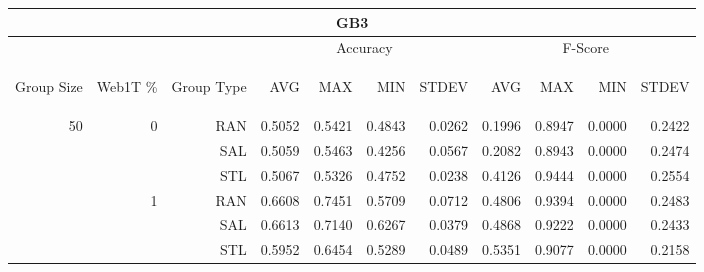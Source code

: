 \begin{center}
\begin{table}[htbp] 
 \begin{center}
\begin{tabular}{ | r | r | r | r | r | r | r | r | r | r | r |}
\hline
\multicolumn{11}{|c|}{GB3}\\
\hline
 & & & \multicolumn{4}{|c|}{Accuracy} & \multicolumn{4}{|c|}{F-Score}\\ \cline{4-11}
\begin{sideways}Group Size\end{sideways} & \begin{sideways}Web1T \%\end{sideways} & \begin{sideways}Group Type\end{sideways} & \begin{sideways}AVG\end{sideways} & \begin{sideways}MAX\end{sideways} & \begin{sideways}MIN\end{sideways} & \begin{sideways}STDEV\end{sideways} & \begin{sideways}AVG\end{sideways} & \begin{sideways}MAX\end{sideways} & \begin{sideways}MIN\end{sideways} & \begin{sideways}STDEV\end{sideways}\\
\hline
\multirow{18}{*}{50}
 & \multirow{3}{*}{0} & RAN & 0.5052 & 0.5421 & 0.4843 & 0.0262 & 0.1996 & 0.8947 & 0.0000 & 0.2422\\ \cline{3-11}
 &   & SAL & 0.5059 & 0.5463 & 0.4256 & 0.0567 & 0.2082 & 0.8943 & 0.0000 & 0.2474\\ \cline{3-11}
 &   & STL & 0.5067 & 0.5326 & 0.4752 & 0.0238 & 0.4126 & 0.9444 & 0.0000 & 0.2554\\ \cline{2-11}
 & \multirow{3}{*}{1} & RAN & 0.6608 & 0.7451 & 0.5709 & 0.0712 & 0.4806 & 0.9394 & 0.0000 & 0.2483\\ \cline{3-11}
 &   & SAL & 0.6613 & 0.7140 & 0.6267 & 0.0379 & 0.4868 & 0.9222 & 0.0000 & 0.2433\\ \cline{3-11}
 &   & STL & 0.5952 & 0.6454 & 0.5289 & 0.0489 & 0.5351 & 0.9077 & 0.0000 & 0.2158\\ \cline{2-11}

\end{tabular}
\end{center}
\end{table}
\end{center}
